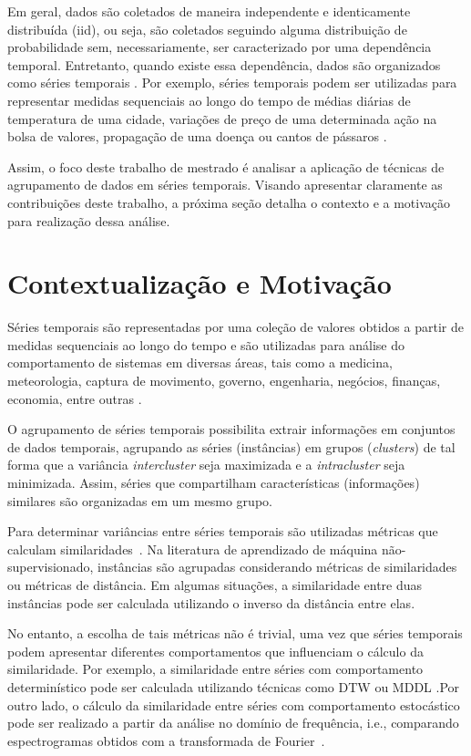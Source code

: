 \documentclass[qual, classic, a4paper]{ufbathesis}
\begin{document}
Em geral, dados são coletados de maneira independente e identicamente distribuída (iid), ou seja, são coletados seguindo alguma distribuição de probabilidade sem, necessariamente, ser caracterizado por uma dependência temporal. Entretanto, quando existe essa dependência, dados são organizados como séries temporais \cite{Esling2012,box2015}. Por exemplo, séries temporais podem ser utilizadas para representar medidas sequenciais ao longo do tempo de médias diárias de temperatura de uma cidade, variações de preço de uma determinada ação na bolsa de valores, propagação de uma doença ou cantos de pássaros \cite{Esling2012}. 

Assim, o foco deste trabalho de mestrado é analisar a aplicação de técnicas de agrupamento de dados em séries temporais. Visando apresentar claramente as contribuições deste trabalho, a próxima seção detalha o contexto e a motivação para realização dessa análise.

\section{Contextualização e Motivação}

Séries temporais são representadas por uma coleção de valores obtidos a partir de medidas sequenciais ao longo do tempo e são utilizadas para análise do comportamento de sistemas em diversas áreas, tais como a medicina, meteorologia, captura de movimento, governo, engenharia, negócios, finanças, economia, entre outras \cite{Esling2012,box2015}. 

O agrupamento de séries temporais possibilita extrair informações em conjuntos de dados temporais, agrupando as séries (instâncias) em grupos (\textit{clusters}) de tal forma que a variância \textit{intercluster} seja maximizada e a \textit{intracluster} seja minimizada. Assim, séries que compartilham características (informações) similares são organizadas em um mesmo grupo.

Para determinar variâncias entre séries temporais são utilizadas métricas que calculam similaridades~\cite{Mori2016}. Na literatura de aprendizado de máquina não-supervisionado, instâncias são agrupadas considerando métricas de similaridades ou métricas de distância. Em algumas situações, a similaridade entre duas instâncias pode ser calculada utilizando o inverso da distância entre elas. 

No entanto, a escolha de tais métricas não é trivial, uma vez que séries temporais podem apresentar diferentes comportamentos que influenciam o cálculo da similaridade. Por exemplo, a similaridade entre séries com comportamento determinístico pode ser calculada utilizando técnicas como \ac{DTW} \cite{tormene2009matching} ou \ac{MDDL} \cite{Araujo2015, Araujo2013}.Por outro lado, o cálculo da similaridade entre séries com comportamento estocástico pode ser realizado a partir da análise no domínio de frequência, i.e., comparando espectrogramas obtidos com a transformada de Fourier~\cite{morettin2006}.
\end{document}
